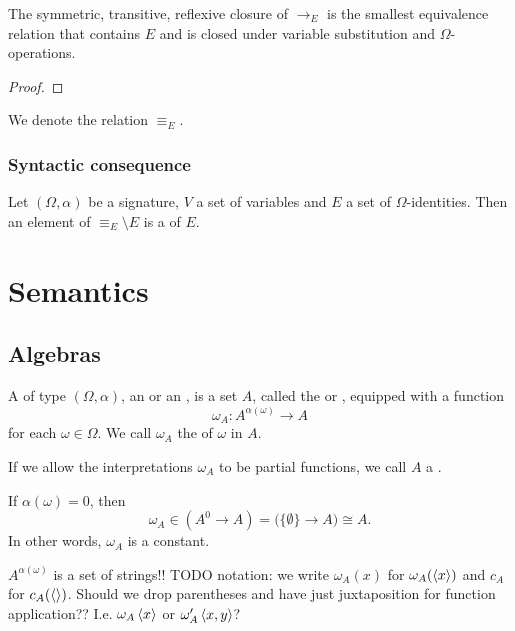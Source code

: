 \begin{lemma}
The symmetric, transitive, reflexive closure of $\to_E$ is the smallest equivalence relation that contains $E$ and is closed under variable substitution and $\Omega$-operations.
\end{lemma}
\begin{proof}

\end{proof}

\begin{definition}
We denote the relation $\equiv_E$.
\end{definition}

\subsubsection{Syntactic consequence}
\begin{definition}
Let $(\Omega, \alpha)$ be a signature, $V$ a set of variables and $E$ a set of $\Omega$-identities. Then an element of $\equiv_E\setminus E$ is a  of $E$.
\end{definition}

\section{Semantics}
\subsection{Algebras}
\begin{definition}
A  of type $(\Omega,\alpha)$, an  or an , is a set $A$, called the  or , equipped with a function
\[ \omega_A: A^{\alpha(\omega)}\to A \]
for each $\omega\in\Omega$. We call $\omega_A$ the  of $\omega$ in $A$.

If we allow the interpretations $\omega_A$ to be partial functions, we call $A$ a .
\end{definition}
If $\alpha(\omega) = 0$, then
\[ \omega_A\in (A^0\to A) = \big(\{\emptyset\}\to A\big) \cong A. \]
In other words, $\omega_A$ is a constant.



$A^{\alpha(\omega)}$ is a set of strings!!
TODO notation: we write $\omega_A(x)$ for $\omega_A(\left\langle x \right\rangle)$ and
$c_A$ for $c_A(\left\langle  \right\rangle)$. Should we drop parentheses and have just juxtaposition for function application?? I.e. $\omega_A\left\langle x \right\rangle$ or $\omega'_A\left\langle x,y \right\rangle$?

